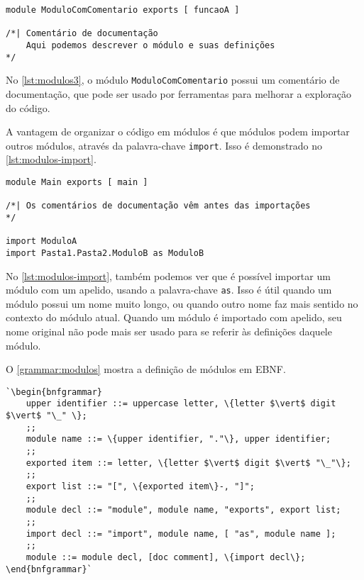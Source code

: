 \begin{lstlisting}[label={lst:modulos3},caption={Exemplo de módulo com comentário de documentação}]
module ModuloComComentario exports [ funcaoA ]

/*| Comentário de documentação
    Aqui podemos descrever o módulo e suas definições
*/
\end{lstlisting}

No \autoref{lst:modulos3}, o módulo \texttt{ModuloComComentario} possui um comentário
de documentação, que pode ser usado por ferramentas para melhorar a exploração
do código.

A vantagem de organizar o código em módulos é que módulos podem importar outros
módulos, através da palavra-chave \texttt{import}. Isso é demonstrado no
\autoref{lst:modulos-import}.

\begin{lstlisting}[label={lst:modulos-import},caption={Exemplo de importação de módulos}]
module Main exports [ main ]

/*| Os comentários de documentação vêm antes das importações
*/

import ModuloA
import Pasta1.Pasta2.ModuloB as ModuloB
\end{lstlisting}

No \autoref{lst:modulos-import}, também podemos ver que é possível importar um
módulo com um apelido, usando a palavra-chave \texttt{as}. Isso é útil quando
um módulo possui um nome muito longo, ou quando outro nome faz mais sentido no
contexto do módulo atual. Quando um módulo é importado com apelido, seu nome
original não pode mais ser usado para se referir às definições daquele módulo.

O \autoref{grammar:modulos} mostra a definição de módulos em EBNF.

\begin{lstlisting}[label={grammar:modulos},caption={Definição de módulos em EBNF},escapechar=`,numbers=none]
`\begin{bnfgrammar}
    upper identifier ::= uppercase letter, \{letter $\vert$ digit $\vert$ "\_" \};
    ;;
    module name ::= \{upper identifier, "."\}, upper identifier;
    ;;
    exported item ::= letter, \{letter $\vert$ digit $\vert$ "\_"\};
    ;;
    export list ::= "[", \{exported item\}-, "]";
    ;;
    module decl ::= "module", module name, "exports", export list;
    ;;
    import decl ::= "import", module name, [ "as", module name ];
    ;;
    module ::= module decl, [doc comment], \{import decl\};
\end{bnfgrammar}`
\end{lstlisting}

